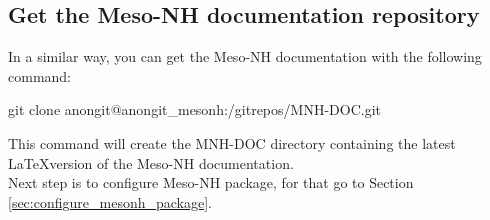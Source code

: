 \subsection{Get the Meso-NH documentation repository}

In a similar way, you can get the Meso-NH documentation with the following command:
\begin{bashcode}
git clone anongit@anongit_mesonh:/gitrepos/MNH-DOC.git
\end{bashcode}

This command will create the MNH-DOC directory containing the latest \LaTeX version of the Meso-NH documentation. \\

Next step is to configure Meso-NH package, for that go to Section \ref{sec:configure_mesonh_package}.

 
